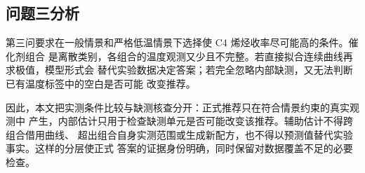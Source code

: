 \subsection{问题三分析}

第三问要求在一般情景和严格低温情景下选择使 C4 烯烃收率尽可能高的条件。催化剂组合
是离散类别，各组合的温度观测又少且不完整。若直接拟合连续曲线再求极值，模型形式会
替代实验数据决定答案；若完全忽略内部缺测，又无法判断已有温度标签中的空白是否可能
改变推荐。

因此，本文把实测条件比较与缺测核查分开：正式推荐只在符合情景约束的真实观测中
产生，内部估计只用于检查缺测单元是否可能改变该推荐。辅助估计不得跨组合借用曲线、
超出组合自身实测范围或生成新配方，也不得以预测值替代实验事实。这样的分层使正式
答案的证据身份明确，同时保留对数据覆盖不足的必要检查。
